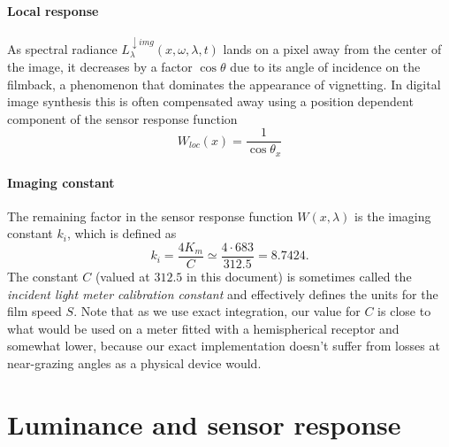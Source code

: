 \paragraph{Local response}
As spectral radiance $L^{\downarrow img}_{\lambda}(x, \omega, \lambda, t)$ lands
on a pixel away from the center of the image, it decreases by a factor
$\cos\theta$ due to its angle of incidence on the filmback, a phenomenon that
dominates the appearance of vignetting. In digital image synthesis this is often
compensated away using a position dependent component of the sensor response
function
\begin{equation}
W_{loc}(x) = \frac{1}{\cos\theta_x}
\end{equation}

\paragraph{Imaging constant}

The remaining factor in the sensor response function $W(x,\lambda)$ is the
imaging constant $k_i$, which is defined as
\begin{equation}\label{eqn:imaging_ki}
 k_i = \frac{4K_m}{C} \simeq \frac{4\cdot683}{312.5} = 8.7424.
\end{equation}
The constant $C$ (valued at $312.5$ in this document) is sometimes called the \textsl{incident light meter
calibration constant} and effectively defines the units for the \gls{film speed} $S$.
Note that as we use exact integration, our value for $C$ is close to what would be used on a meter fitted with a hemispherical receptor and somewhat lower, because our exact implementation doesn't suffer from losses at near-grazing angles as a physical device would.


\section{Luminance and sensor response}

